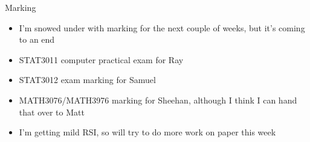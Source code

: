 \documentclass{beamer}
\begin{document}
\begin{frame}{Marking}
	\begin{itemize}
		\item I'm snowed under with marking for the next couple of weeks, but it's coming to an end
		\item STAT3011 computer practical exam for Ray
		\item STAT3012 exam marking for Samuel
		\item MATH3076/MATH3976 marking for Sheehan, although I think I can hand that over to Matt
		\item I'm getting mild RSI, so will try to do more work on paper this week
	\end{itemize}
\end{frame}
\end{document}
